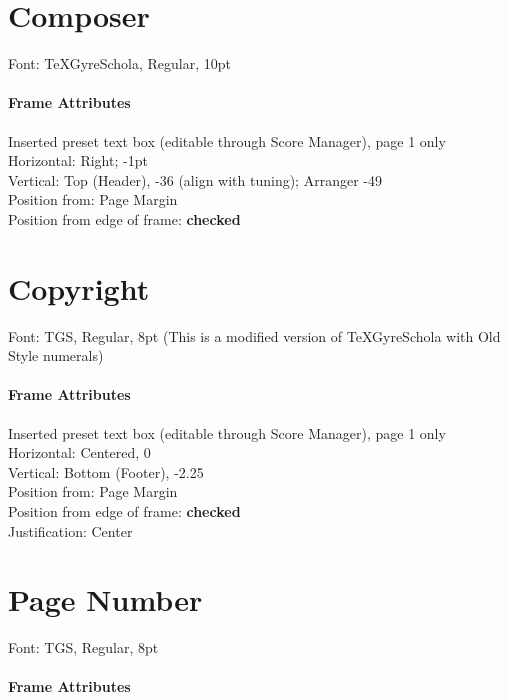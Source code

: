 \documentclass[]{memoir}
\begin{document}
\section{Composer}
\label{sec:composer}

Font: TeXGyreSchola, Regular, 10pt\\

\paragraph{Frame Attributes}
\label{sec:frame-attributes-2}

Inserted preset text box (editable through Score Manager), page 1 only\\
Horizontal: Right; -1pt\\
Vertical: Top (Header), -36 (align with tuning); Arranger -49\\
Position from: Page Margin\\
Position from edge of frame: \textbf{checked}\\

\section{Copyright}
\label{sec:copyright}

Font: TGS, Regular, 8pt (This is a modified version of TeXGyreSchola with Old Style numerals)

\paragraph{Frame Attributes}
\label{sec:frame-attributes-3}

Inserted preset text box (editable through Score Manager), page 1 only\\
Horizontal: Centered, 0\\
Vertical: Bottom (Footer), -2.25\\
Position from: Page Margin\\
Position from edge of frame: \textbf{checked}\\
Justification: Center

\section{Page Number}
\label{sec:page-number}

Font: TGS, Regular, 8pt

\paragraph{Frame Attributes}
\label{sec:frame-attributes-4}
\end{document}
